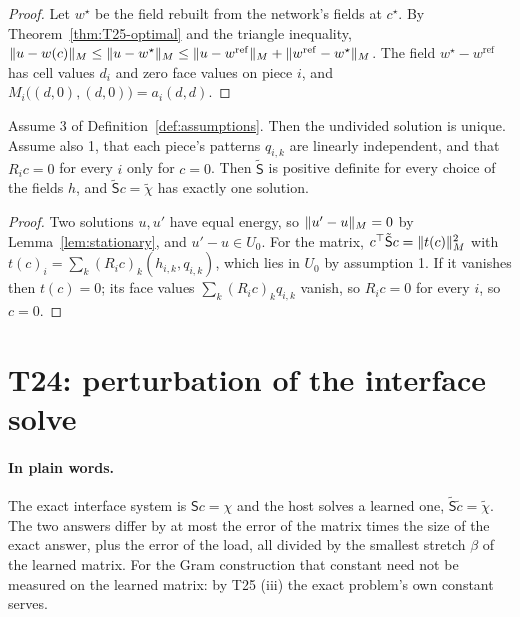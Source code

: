\begin{proof}
  \leanok
  Let $w^\star$ be the field rebuilt from the network's fields at $c^\star$.
  By Theorem~\ref{thm:T25-optimal} and the triangle inequality,
  $\lVert u-w(c)\rVert_M\le\lVert u-w^\star\rVert_M
  \le\lVert u-w^{\mathrm{ref}}\rVert_M+\lVert w^{\mathrm{ref}}-w^\star\rVert_M$.  The field
  $w^\star-w^{\mathrm{ref}}$ has cell values $d_i$ and zero face values on piece
  $i$, and $M_i\bigl((d,0),(d,0)\bigr)=a_i(d,d)$.
\end{proof}

\begin{theorem}\label{thm:T25-solvable}
  \leanok
  Assume 3 of Definition~\ref{def:assumptions}.  Then the undivided solution
  is unique.  Assume also 1, that each piece's patterns $q_{i,k}$ are linearly
  independent, and that $R_ic=0$ for every $i$ only for $c=0$.  Then
  $\tilde{\mathsf S}$ is positive definite for every choice of the fields $h$,
  and $\tilde{\mathsf S}c=\tilde\chi$ has exactly one solution.
\end{theorem}

\begin{proof}
  \leanok
  Two solutions $u,u'$ have equal energy, so $\lVert u'-u\rVert_M=0$ by
  Lemma~\ref{lem:stationary}, and $u'-u\in U_0$.  For the matrix,
  $c^\top\tilde{\mathsf S}c=\lVert t(c)\rVert_M^2$ with
  $t(c)_i=\sum_k(R_ic)_k(h_{i,k},q_{i,k})$, which lies in $U_0$ by assumption
  1.  If it vanishes then $t(c)=0$; its face values $\sum_k(R_ic)_kq_{i,k}$
  vanish, so $R_ic=0$ for every $i$, so $c=0$.
\end{proof}

\section{T24: perturbation of the interface solve}

\paragraph{In plain words.}
The exact interface system is $\mathsf Sc=\chi$ and the host solves a learned
one, $\tilde{\mathsf S}\tilde c=\tilde\chi$.  The two answers differ by at most
the error of the matrix times the size of the exact answer, plus the error of
the load, all divided by the smallest stretch $\beta$ of the learned matrix.
For the Gram construction that constant need not be measured on the learned
matrix: by T25 (iii) the exact problem's own constant serves.

